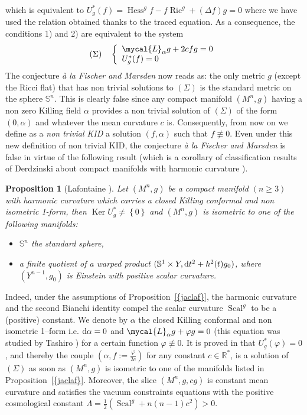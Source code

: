 \documentclass[a4paper,11pt,leqno]{amsart}
\numberwithin{equation}{section}
\theoremstyle{main}
\newtheorem{prop} [thm] {\bf  Proposition}
\begin{document}
which is equivalent to $U_g^* (f)= {\operatorname{Hess}}^g f -f {\operatorname{Ric}}^g + (\Delta f) g =0 $ where we have used the relation obtained  thanks to the traced equation. As a consequence, the conditions 1) and 2) are equivalent to the system
$$(\Sigma)\quad \left\{
\begin{array}{l}
	 \mycal{L}_\alpha g + 2cfg= 0 \\
	 U_g^* (f)=0
\end{array}\right. $$
The conjecture \textit{à la Fischer and Marsden} now reads as: the only metric $g$ (except the Ricci flat) that has non trivial solutions to $(\Sigma)$ is the standard metric on the sphere ${{\mathbb S^{n}}}$. This is clearly false since any compact manifold $(M^n,g)$ having a non zero Killing field $\alpha$ provides a non trivial solution of $(\Sigma)$ of the form $(0,\alpha)$ and whatever the mean curvature $c$ is. Consequently, from now on we define as a \textit{non trivial KID} a solution $(f,\alpha)$ such that $f\not\equiv  0$. Even under this new definition of non trivial KID, the conjecture  \textit{à la Fischer and Marsden} is false in virtue of the following result (which is a corollary of classification results of Derdzinski about compact manifolds with harmonic curvature \cite{D1,D2}).
\begin{prop}[Lafontaine \cite{L}]\label{jaclaf}
Let $(M^n,g)$ be a compact manifold $(n\ge 3)$ with harmonic curvature which carries a closed Killing conformal and non isometric 1-form, then  ${{\operatorname{Ker}} U^*_g \not = \left\{0 \right\}}$ and $(M^n,g)$ is isometric to one of the following manifolds:
\begin{itemize}
	\item[(i)] ${{\mathbb S^{n}}}$ the standard sphere,\\
	\item[(ii)] a finite quotient  of a warped product $(\mathbb S^1 \times Y, {{\rm d}} t^2 + h^2 (t)g_0)$, where $(Y^{n-1},g_0)$ is Einstein with positive scalar curvature.
\end{itemize}
\end{prop}
Indeed, under the assumptions of Proposition~{\ref{{jaclaf}}}, the harmonic curvature and the second Bianchi identity compel the scalar curvature ${\operatorname{Scal}}^g$ to be a (positive) constant. We denote by $\alpha$ the closed Killing conformal and non isometric 1--form i.e. ${{\rm d}} \alpha =0$ and ${\mycal{L}_\alpha g + \varphi g= 0}$ (this equation was studied by Tashiro \cite{T}) for a certain function $\varphi\not \equiv 0$. It is proved in \cite{L} that $ U_g^* (\varphi)=0$, and thereby the couple $(\alpha, f:= \frac{\varphi}{2c} )$ for any constant $c\in {{\mathbb R}}^*$, is a solution of $(\Sigma)$ as soon as $(M^n,g)$ is isometric to one of the manifolds listed in Proposition~{\ref{{jaclaf}}}. Moreover, the slice $(M^n,g,cg)$ is constant mean curvature and satisfies the vacuum constraints equations with the positive cosmological constant $\Lambda=\frac{1}{2}\left({\operatorname{Scal}}^g + n(n-1)c^2\right)>0$.\\
\end{document}
